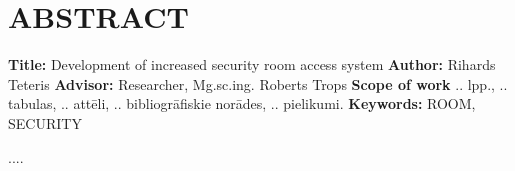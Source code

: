 \chapter*{ABSTRACT}
\noindent \textbf{Title:} Development of increased security room access system\newline
\textbf{Author:} Rihards Teteris\newline
\textbf{Advisor:} Researcher, Mg.sc.ing. Roberts Trops\newline
\textbf{Scope of work} .. lpp., .. tabulas, .. attēli, .. bibliogrāfiskie norādes, .. pielikumi.\newline
\textbf{Keywords:} ROOM, SECURITY\newline

....
